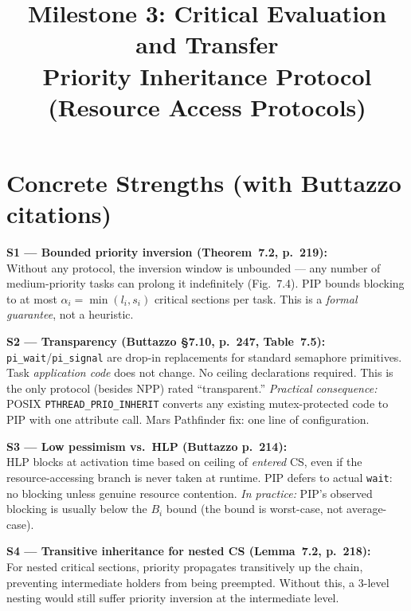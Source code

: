 \documentclass[conference,onecolumn]{IEEEtran}
\begin{document}
\title{Milestone 3: Critical Evaluation and Transfer\\
  {\large Priority Inheritance Protocol (Resource Access Protocols)}}

\author{
}

\maketitle

\section{Concrete Strengths (with Buttazzo citations)}

\textbf{S1 --- Bounded priority inversion (Theorem~7.2, p.~219):}\\
Without any protocol, the inversion window is unbounded --- any number
of medium-priority tasks can prolong it indefinitely (Fig.~7.4).
PIP bounds blocking to at most $\alpha_i = \min(l_i, s_i)$ critical
sections per task. This is a \emph{formal guarantee}, not a heuristic.

\textbf{S2 --- Transparency (Buttazzo \S7.10, p.~247, Table~7.5):}\\
\texttt{pi\_wait}/\texttt{pi\_signal} are drop-in replacements for
standard semaphore primitives. Task \emph{application code} does not change.
No ceiling declarations required.
This is the only protocol (besides NPP) rated ``transparent.''
\emph{Practical consequence:} POSIX \texttt{PTHREAD\_PRIO\_INHERIT}
converts any existing mutex-protected code to PIP with one attribute
call. Mars Pathfinder fix: one line of configuration.

\textbf{S3 --- Low pessimism vs.\ HLP (Buttazzo p.~214):}\\
HLP blocks at activation time based on ceiling of \emph{entered} CS,
even if the resource-accessing branch is never taken at runtime.
PIP defers to actual \texttt{wait}: no blocking unless genuine
resource contention.
\emph{In practice:} PIP's observed blocking is usually below the
$B_i$ bound (the bound is worst-case, not average-case).

\textbf{S4 --- Transitive inheritance for nested CS (Lemma~7.2, p.~218):}\\
For nested critical sections, priority propagates transitively up the
chain, preventing intermediate holders from being preempted.
Without this, a 3-level nesting would still suffer priority inversion
at the intermediate level.
\end{document}
